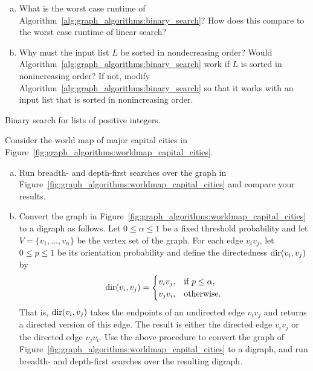 \begin{problem}
\begin{enumerate}[(a)]
  \item What is the worst case runtime of
    Algorithm~\ref{alg:graph_algorithms:binary_search}? How does this
    compare to the worst case runtime of linear search?

  \item Why must the input list $L$ be sorted in nondecreasing order?
    Would Algorithm~\ref{alg:graph_algorithms:binary_search} work if
    $L$ is sorted in nonincreasing order? If not, modify
    Algorithm~\ref{alg:graph_algorithms:binary_search} so that it
    works with an input list that is sorted in nonincreasing order.
  \end{enumerate}

\begin{algorithm}[!htpb]

\caption{Binary search for lists of positive integers.}
\label{alg:graph_algorithms:binary_search}
\end{algorithm}

\item Consider the world map of major capital cities in
  Figure~\ref{fig:graph_algorithms:worldmap_capital_cities}.
  \begin{enumerate}[(a)]
  \item Run breadth- and
    depth-first searches over the graph in
    Figure~\ref{fig:graph_algorithms:worldmap_capital_cities} and
    compare your results.

  \item Convert the graph in
    Figure~\ref{fig:graph_algorithms:worldmap_capital_cities} to a
    digraph as follows. Let $0 \leq \alpha \leq 1$ be a fixed
    threshold probability and let
    $V = \{v_1, \dots, v_n\}$ be the vertex set of the graph. For each
    edge $v_i v_j$, let $0 \leq p \leq 1$ be its
    orientation probability and define
    the directedness $\operatorname*{dir}(v_i, v_j)$\index{$\dir$} by
    \[
    \operatorname*{dir}(v_i, v_j)
    =
    \begin{cases}
    v_i v_j, & \text{if $p \leq \alpha$,} \\
    v_j v_i, & \text{otherwise.}
    \end{cases}
    \]
    That is, $\operatorname*{dir}(v_i, v_j)$ takes the endpoints of an undirected
    edge $v_i v_j$ and returns a directed version of this edge. The
    result is either the directed edge $v_i v_j$ or the directed edge
    $v_j v_i$. Use the above procedure to convert the graph of
    Figure~\ref{fig:graph_algorithms:worldmap_capital_cities} to a
    digraph, and run breadth- and
    depth-first searches over the resulting
    digraph.


\end{enumerate}
\end{problem}

